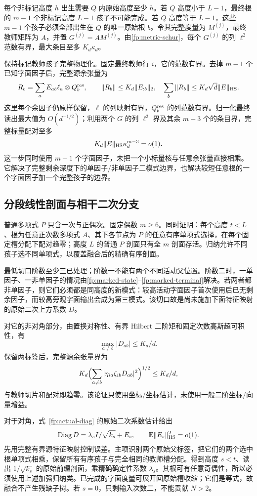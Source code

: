 \documentclass[a4paper]{tufte-handout}
\begin{document}
\begin{fullwidth}
每个非标记高度 $h$ 出生需要 $Q$ 内原始高度至少 $h$。若 $Q$ 高度小于 $L-1$，最终根的 $m-1$ 个非标记高度 $L-1$ 孩子不可能完成。若 $Q$ 高度等于 $L-1$，这些 $m-1$ 个孩子必须全部出生在 $Q$ 的唯一原始根 $b$。令其完整度量为 $M^{(j)}$，最终教师矩阵为 $A$，并置 $G^{(j)}=AM^{(j)}$。由\eqref{fp:metric-schur}，每个 $G^{(j)}$ 的列 $\ell^2$ 范数有界，最大条目至多 $K_d\kappa_d$。

保持标记教师孩子完整物理化。固定最终教师行 $i$，它的范数有界。去掉 $m-1$ 个已知字面因子后，完整源余张量为
\[
 R_b=\sum_aE_{ab}\ell_a\otimes Q_b^{\rm res},\qquad
 \|R_b\|\le K_d\|E_{:b}\|_2,
 \quad\sum_b\|R_b\|\le K_d\sqrt d\|E\|_{\rm HS}.
\]
这里每个余因子仍原样保留，$\ell$ 的列映射有界，$Q_b^{\rm res}$ 的列范数有界。归一化最终读出最大值为 $O(d^{-1/2})$；利用两个 $G$ 的列 $\ell^2$ 界及其余 $m-3$ 个的条目界，完整标量配对至多
\begin{equation}\label{fp:marked-terminal}
 K_d\|E\|_{\rm HS}\kappa_d^{m-3}=o(1).
\end{equation}
这一步同时使用 $m-1$ 个字面因子，未把一个小标量核与任意余张量直接相乘。它解决了完整剩余深度下的单因子/非单因子二模式边界，也解决较短任意根的一个字面因子加一个完整孩子的边界。

\subsection{分段线性剖面与相干二次分支}
普通多项式 $P$ 只含一次与正偶次。固定偶数 $m\ge6$。同时证明：每个高度 $t<L$、根为任意正次数多项式 $A$、其下各节点为 $P$ 的任意有序单项式选择，在每个固定槽分配下配对趋零；高度 $L$ 的普通 $P$ 剖面只有全 $m$ 剖面存活。归纳允许不同孩子选不同单项式，以覆盖融合后的精确有序剖面。

最低切口阶数至少三已处理；阶数一不能有两个不同活动父位置。阶数二时，一单因子、一非单因子的情况由\eqref{fp:marked-state}--\eqref{fp:marked-terminal}解决。若两者都非单因子，则它们必须都是同高度的新模式：较高活动字面因子首次使用后已无剩余因子，而较高旁观字面输出会成为第三模式。该切口故是尚未施加下面特征映射的原始二次上方系数 $D$。

对它的非对角部分，由置换对称性、有界 Hilbert 二阶矩和固定次数高斯超可积性，有
\[
 \max_{a\ne b}|D_{ab}|\le K_d/d.
\]
保留两标签后，完整源余张量界为
\[
 K_d\Bigl(\sum_{a\ne b}|\eta_{ia}\zeta_{ib}D_{ab}|^2\Bigr)^{1/2}
 \le K_d/d,
\]
与教师切片和配对即趋零。该论证只使用坐标/坐标估计，未使用一般二阶坐标/向量增益。

对于对角，式~\eqref{fp:actual-diag} 的原始二次系数估计给出
\begin{equation}\label{fp:coherent-diagonal}
 \operatorname{Diag}D=\lambda_s I/\sqrt{k_s}+E_s,
 \qquad\mathbb E\|E_s\|_{\rm HS}^2=o(1).
\end{equation}
先用完整有界源特征映射控制误差。主项识别两个原始父标签，把它们的两个选中根单项式相乘，保留所有有序孩子与完全相同的教师槽分配。得到高度 $s<t$、读出 $1/\sqrt{k_s}$ 的原始前缀剖面，乘精确确定性系数 $\lambda_s$。其根可有任意奇偶性，所以必须使用上述加强归纳类。已完成的字面度量可展开回原始槽收缩；它们是等式，故融合不产生残缺子树。若 $s=0$，只剩输入次数二，不能贡献 $N>2$。


\end{fullwidth}
\end{document}

